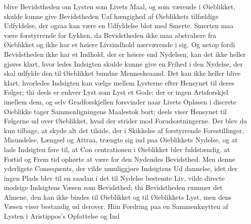 \documentclass[12pt,a4paper]{book}
\newcommand{\gk}[1]{\textit{#1}}
\begin{document}
blive Bevidstheden om Lysten som Livets Maal, og som
værende i Øieblikket, skulde kunne give Bevidstheden Uaf\-%
hængighed af Øieblikkets tilfældige Udfyldelse, der ogsaa kan
være en Udfyldelse blot med Smerte. Smerten maa være
forstyrrende for Lykken, da Bevidstheden ikke maa abstrahere
fra Øieblikket og ikke har et høiere Livsindhold nærværende
i sig. Og netop fordi Bevidstheden ikke har et Indhold, der
er høiere end Nydelsen, kan det ikke heller gjøres klart, hvor\-%
ledes Indsigten skulde kunne give en Frihed i den Nydelse,
der skal udfylde den til Øieblikket bundne Menneskeaand.
Det kan ikke heller blive klart, hvorledes Indsigten kan vælge
mellem Lysterne efter Hensynet til deres Følger; thi deels er
enhver Lyst som Lyst et Gode; der er ingen Artsforskjel
imellem dem, og selv Gradforskjellen forsvinder naar Livets
Opløsen i discrete Øieblikke tager Sammenligningens Maalestok
bort; deels viser Hensynet til Følgerne ud over Øieblikket,
hvad der strider mod Forudsætningerne. Der blev da kun
tilbage, at skyde alt det tilside, der i Skikkelse af forstyrrende
Forestillinger, Misundelse, Længsel og Attraa, trængte sig ind
paa Øieblikkets Nydelse, og at lade Indsigten føre til, at Con\-%
centrationen i Øieblikket blev fuldstændig, at Fortid og Frem\-%
tid ophørte at være for den Nydendes Bevidsthed. Men denne
yderligste Consequents, der vilde umuliggjøre Indsigtens Ud\-%
dannelse, idet der ingen Plads blev til en saadan i det til
Nydelse bestemte Liv, vilde directe modsige Indsigtens Væsen
som Bevidsthed; thi Bevidstheden rummer det Almene, den
kan ikke bindes til Øieblikket og til Øieblikkets Lyst, men
dens Væsen viser bestandig ud derover. Hiin Fordring paa
en Sammenknytten af Lysten i Aristippos's Opfattelse og Ind\-%
\end{document}
